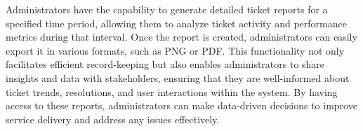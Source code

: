 	Administrators have the capability to generate detailed ticket reports for a specified time period, allowing them to analyze ticket activity and performance metrics during that interval. Once the report is created, administrators can easily export it in various formats, such as PNG or PDF. This functionality not only facilitates efficient record-keeping but also enables administrators to share insights and data with stakeholders, ensuring that they are well-informed about ticket trends, resolutions, and user interactions within the system. By having access to these reports, administrators can make data-driven decisions to improve service delivery and address any issues effectively.
	
	
	
	
	
	
	
	
	
	
	

	
	
	
	
	
	
	
	
	
	



